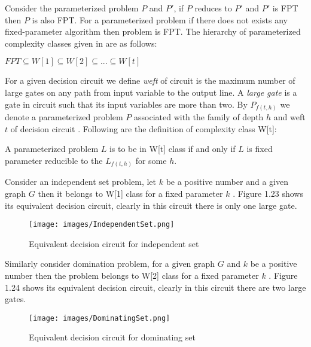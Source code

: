 \noindent
Consider the parameterized problem $P$ and $P'$, if $P$ reduces to $P'$ and $P'$ is FPT then $P$ is also FPT. For a parameterized problem if there does not exists any fixed-parameter algorithm then problem is FPT. The hierarchy of parameterized complexity classes given in \cite{ppc} are as follows:
\begin{center}
$FPT \subseteq W[1] \subseteq W[2] \subseteq ... \subseteq W[t]$
\end{center}
\noindent
For a given decision circuit we define \textit{weft} of circuit is the maximum number of large gates on any path from input variable to the output line. A \textit{large gate} is a gate in circuit such that its input variables are more than two. By $P_{f(t,h)}$ we denote a parameterized problem $P$ associated with the family of depth $h$ and  weft $t$ of decision circuit \cite{ppc}. Following are the definition of complexity class W[t]:
\begin{Definition}
A parameterized problem $L$ is to be in W[t] class if and only if $L$ is fixed parameter reducible to the $L_{f(t,h)}$ for some $h$. 
\end{Definition}
\noindent 
Consider an independent set problem, let $k$ be a positive number and a given graph $G$ then it belongs to W[1] class for a fixed parameter $k$ \cite{ppc}. Figure 1.23 shows its equivalent decision circuit, clearly in this circuit there is only one large gate.
\begin{figure}[H]
\centering
\texttt{[image: images/IndependentSet.png]}
    \caption{Equivalent decision circuit for independent set}
\end{figure}
\noindent 
Similarly consider domination problem, for a given graph $G$ and $k$ be a positive number then the problem belongs to W[2] class for a fixed parameter $k$  \cite{ppc} . Figure 1.24 shows its equivalent decision circuit, clearly in this circuit there are two large gates.
\begin{figure}[H]
\centering
\texttt{[image: images/DominatingSet.png]}
    \caption{Equivalent decision circuit for dominating set}
\end{figure}
\noindent 
